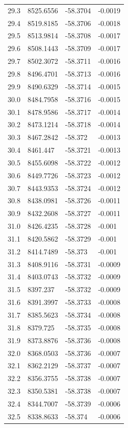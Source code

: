 \begin{table}[H]
\begin{tabular}{llll}
29.3 & 8525.6556 & -58.3704 & -0.0019 \\
29.4 & 8519.8185 & -58.3706 & -0.0018 \\
29.5 & 8513.9814 & -58.3708 & -0.0017 \\
29.6 & 8508.1443 & -58.3709 & -0.0017 \\
29.7 & 8502.3072 & -58.3711 & -0.0016 \\
29.8 & 8496.4701 & -58.3713 & -0.0016 \\
29.9 & 8490.6329 & -58.3714 & -0.0015 \\
30.0 & 8484.7958 & -58.3716 & -0.0015 \\
30.1 & 8478.9586 & -58.3717 & -0.0014 \\
30.2 & 8473.1214 & -58.3718 & -0.0014 \\
30.3 & 8467.2842 & -58.372 & -0.0013 \\
30.4 & 8461.447 & -58.3721 & -0.0013 \\
30.5 & 8455.6098 & -58.3722 & -0.0012 \\
30.6 & 8449.7726 & -58.3723 & -0.0012 \\
30.7 & 8443.9353 & -58.3724 & -0.0012 \\
30.8 & 8438.0981 & -58.3726 & -0.0011 \\
30.9 & 8432.2608 & -58.3727 & -0.0011 \\
31.0 & 8426.4235 & -58.3728 & -0.001 \\
31.1 & 8420.5862 & -58.3729 & -0.001 \\
31.2 & 8414.7489 & -58.373 & -0.001 \\
31.3 & 8408.9116 & -58.3731 & -0.0009 \\
31.4 & 8403.0743 & -58.3732 & -0.0009 \\
31.5 & 8397.237 & -58.3732 & -0.0009 \\
31.6 & 8391.3997 & -58.3733 & -0.0008 \\
31.7 & 8385.5623 & -58.3734 & -0.0008 \\
31.8 & 8379.725 & -58.3735 & -0.0008 \\
31.9 & 8373.8876 & -58.3736 & -0.0008 \\
32.0 & 8368.0503 & -58.3736 & -0.0007 \\
32.1 & 8362.2129 & -58.3737 & -0.0007 \\
32.2 & 8356.3755 & -58.3738 & -0.0007 \\
32.3 & 8350.5381 & -58.3738 & -0.0007 \\
32.4 & 8344.7007 & -58.3739 & -0.0006 \\
32.5 & 8338.8633 & -58.374 & -0.0006 \\

\end{tabular}
\end{table}
